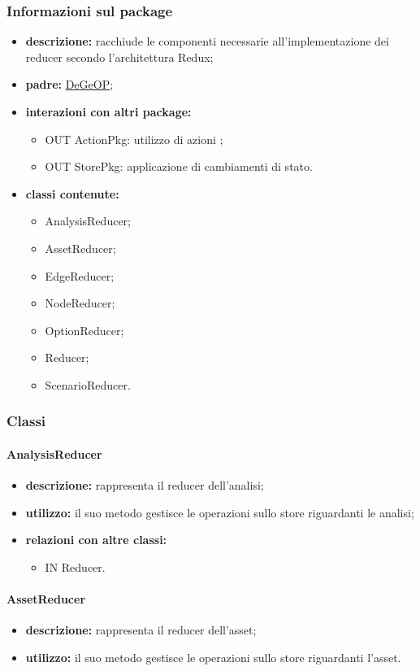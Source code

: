 \subsubsection{Informazioni sul package}
\begin{itemize}
	\item \textbf{descrizione:} racchiude le componenti necessarie all'implementazione dei reducer secondo l'architettura Redux;
	\item \textbf{padre:} \hyperref[pkg::DeGeOP]{DeGeOP};
	\item \textbf{interazioni con altri package:} 
	\begin{itemize}
		\item OUT ActionPkg: utilizzo di azioni ;
		\item OUT StorePkg: applicazione di cambiamenti di stato.
	\end{itemize}
	\item \textbf{classi contenute:}
	\begin{itemize}
		\item AnalysisReducer;
		\item AssetReducer;
		\item EdgeReducer;
		\item NodeReducer;
		\item OptionReducer;
		\item Reducer;
		\item ScenarioReducer.
	\end{itemize}
\end{itemize}
\subsubsection{Classi}
\paragraph{AnalysisReducer}
\begin{itemize}
	\item \textbf{descrizione:} rappresenta il reducer dell'analisi;
	\item \textbf{utilizzo:} il suo metodo gestisce le operazioni sullo store riguardanti le analisi;
	\item \textbf{relazioni con altre classi:} 
	\begin{itemize}
		\item IN Reducer.
	\end{itemize}
\end{itemize}
\paragraph{AssetReducer}
\begin{itemize}
	\item \textbf{descrizione:} rappresenta il reducer dell'asset;
	\item \textbf{utilizzo:} il suo metodo gestisce le operazioni sullo store riguardanti l'asset.
\end{itemize}
